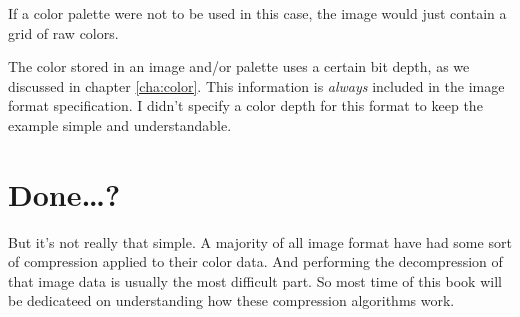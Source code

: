 If a color palette were not to be used in this case, the image would
just contain a grid of raw colors.

The color stored in an image and/or palette uses a certain bit depth,
as we discussed in chapter \ref{cha:color}. This information is
\textit{always} included in the image format specification. I didn't
specify a color depth for this format to keep the example simple and
understandable.

\section{Done\dots?}

But it's not really that simple. A majority of all image format have
had some sort of compression applied to their color data. And
performing the decompression of that image data is usually the
most difficult part. So most time of this book will be dedicateed on
understanding how these compression algorithms work.


\FloatBarrier
